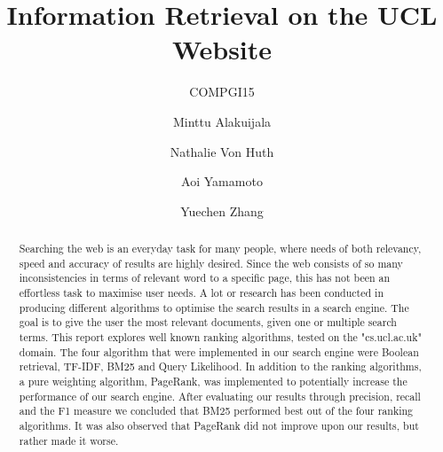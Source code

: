 \documentclass[sigconf]{acmart}
\begin{document}
\title{Information Retrieval on the UCL Website}
\subtitle{COMPGI15}


\author{Minttu Alakuijala}
\affiliation{\institution{}}

\author{Nathalie Von Huth}
\affiliation{\institution{}}

\author{Aoi Yamamoto}
\affiliation{\institution{}}

\author{Yuechen Zhang}
\affiliation{\institution{}}



\begin{abstract}
Searching the web is an everyday task for many people, where needs of both relevancy, speed and accuracy of results are highly desired. Since the web consists of so many inconsistencies in terms of relevant word to a specific page, this has not been an effortless task to maximise user needs. A lot or research has been conducted in producing different algorithms to optimise the search results in a search engine. The goal is to give the user the most relevant documents, given one or multiple search terms. This report explores well known ranking algorithms, tested on the "cs.ucl.ac.uk" domain. The four algorithm that were implemented in our search engine were Boolean retrieval, TF-IDF, BM25 and Query Likelihood. In addition to the ranking algorithms, a pure weighting algorithm, PageRank, was implemented to potentially increase the performance of our search engine. After evaluating our results through precision, recall and the F1 measure we concluded that BM25 performed best out of the four ranking algorithms. It was also observed that PageRank did not improve upon our results, but rather made it worse. 
\end{abstract}

\maketitle




 
\end{document}
